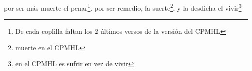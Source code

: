 por ser más muerte el penar\footnote{\textsuperscript{}De cada coplilla faltan los 2 últimos versos de la versión del CPMHL}.
por ser remedio, la suerte\footnote{\textsuperscript{}muerte en el CPMHL}.
y la desdicha el vivir\footnote{\textsuperscript{}en el CPMHL es sufrir en vez de vivir}

